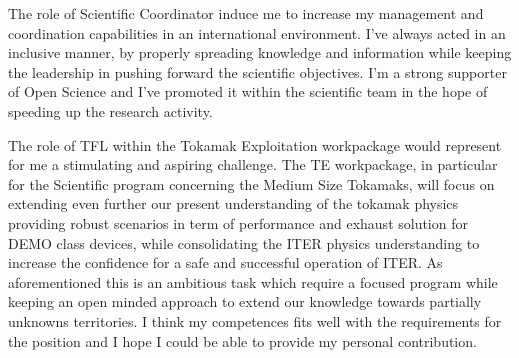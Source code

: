 \documentclass[12pt,a4paper,sans]{moderncv}        %
\begin{document}
The role of Scientific Coordinator induce me to increase my  management and coordination capabilities in an
international environment. I've always acted in an inclusive
manner, by properly spreading knowledge and information while keeping
the leadership in pushing forward the scientific objectives. I'm a
strong supporter of Open Science and I've promoted it
within the scientific team in the hope of speeding up the research activity.

The role of TFL within the Tokamak Exploitation workpackage would represent
for me a stimulating and aspiring challenge. The TE workpackage, in
particular for the Scientific program concerning the Medium Size
Tokamaks, will focus on extending even further our present understanding of
the tokamak physics providing robust scenarios in term of performance
and exhaust solution for DEMO class devices, while consolidating
the ITER physics understanding to increase the confidence for a
safe and successful operation of ITER. As aforementioned this is an
ambitious task which require a focused program while keeping an open
minded approach to extend our knowledge towards partially unknowns
territories. I think my competences fits well with the requirements
for the position and I hope I could be able to provide my personal contribution.


\makeletterclosing
\end{document}
